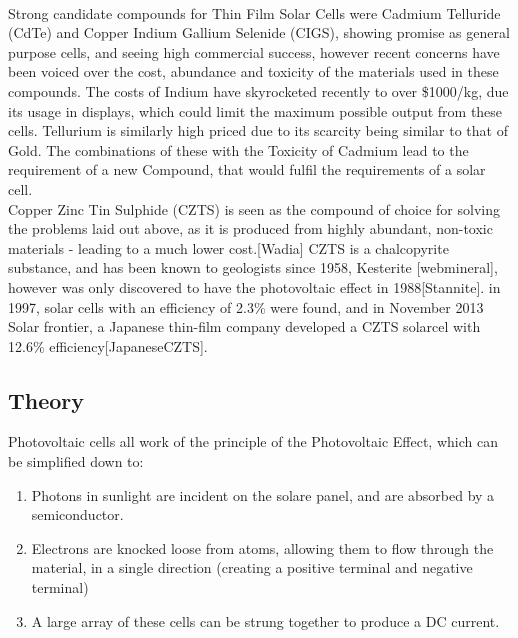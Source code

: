 \\Strong candidate compounds for Thin Film Solar Cells were Cadmium Telluride (CdTe) and Copper Indium Gallium Selenide (CIGS), showing promise as general purpose cells, and seeing high commercial success, however recent concerns have been voiced over the cost, abundance and toxicity of the materials used in these compounds. The costs of Indium have skyrocketed recently to over \$1000/kg, due its usage in displays, which could limit the maximum possible output from these cells. Tellurium is similarly high priced due to its scarcity being similar to that of Gold. The combinations of these with the Toxicity of Cadmium lead to the requirement of a new Compound, that would fulfil the requirements of a solar cell.
\\Copper Zinc Tin Sulphide (CZTS) is seen as the compound of choice for solving the problems laid out above, as it is produced from highly abundant, non-toxic materials - leading to a much lower cost.[Wadia] CZTS is a chalcopyrite substance, and has been known to geologists since 1958, Kesterite [webmineral], however was only discovered to have the photovoltaic effect in 1988[Stannite]. in 1997, solar cells with an efficiency of 2.3\% were found, and in November 2013 Solar frontier, a Japanese thin-film company developed a CZTS solarcel with 12.6\% efficiency[JapaneseCZTS].

\subsection{Theory}
	Photovoltaic cells all work of the principle of the Photovoltaic Effect, which can be simplified down to:

	\begin{enumerate}
	\item Photons in sunlight are incident on the solare panel, and are absorbed by a semiconductor.
	\item Electrons are knocked loose from atoms, allowing them to flow through the material, in a single direction (creating a positive terminal and negative terminal)
	\item A large array of these cells can be strung together to produce a DC current.
	\end{enumerate}